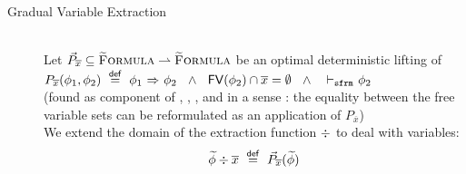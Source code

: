 \begin{description}
    \begin{comment} %
    \item[Gradual Variable Extraction]
    Let $\dgrad{P}_x \subseteq \setGFormula \rightharpoonup \setGFormula$ be an optimal deterministic lifting of 
    \\$P_x(\phi_1, \phi_2) ~\defeq~ \phiImplies{\phi_1}{\phi_2} ~~\wedge~~ x \not \in \FV(\phi_2) ~~\wedge~~ \sfrmphi \phi_2$ 
    \\(found as component of \tset{HAlloc}, \tset{HVarAssign}, \tset{HReturn}, \tset{HCall} and in a sense \tset{HHold}: the equality between the free variable sets can be reformulated as repeated application of $P_x$)
    \\We extend the domain of the extraction function $\wo{}{}$ to deal with variables:
    \begin{displaymath}
    \wo{\grad{\phi}}{x} ~\defeq~ \dgrad{P}_x(\grad{\phi})
    \end{displaymath}
    \end{comment}
    
    \item[Gradual Variable Extraction]~\\
    Let $\vec{P}_{\overline{x}} \subseteq \textup{\textsc{\ensuremath{\widetilde{\text{F}}}ormula}} \rightharpoonup \textup{\textsc{\ensuremath{\widetilde{\text{F}}}ormula}}$ be an optimal deterministic lifting of 
    \\$P_{\overline{x}}(\phi_1, \phi_2) ~\overset{\textup{\textmd{\textsf{def}}}}{=}~ {\phi_1} \,\,{\Rightarrow}\,\, {\phi_2} ~~\wedge~~ \textup{\textmd{\textsf{FV}}}(\phi_2) \cap \overline{x} = \emptyset ~~\wedge~~ \,\,{\vdash_\texttt{sfrm}}\,\, \phi_2$ 
    \\(found as component of , , ,  and in a sense : the equality between the free variable sets can be reformulated as an application of $P_{\overline{x}}$)
    \\We extend the domain of the extraction function $\div$ to deal with variables:
    \begin{displaymath}
    \widetilde{\phi}\div\overline{x} ~\overset{\textup{\textmd{\textsf{def}}}}{=}~ \vec{P}_{\overline{x}}(\widetilde{\phi})
    \end{displaymath}
\end{description}